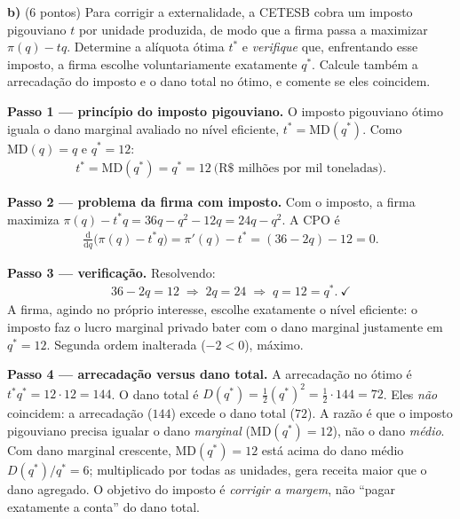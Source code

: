 \textbf{b)} (6 pontos) Para corrigir a externalidade, a CETESB cobra um imposto pigouviano $t$ por unidade produzida, de modo que a firma passa a maximizar $\pi(q)-tq$. Determine a alíquota ótima $t^{*}$ e \emph{verifique} que, enfrentando esse imposto, a firma escolhe voluntariamente exatamente $q^{*}$. Calcule também a arrecadação do imposto e o dano total no ótimo, e comente se eles coincidem.
\resolucaobox{5.5cm}
\begin{solucao}
\textbf{Passo 1 — princípio do imposto pigouviano.} O imposto pigouviano ótimo iguala o dano marginal avaliado no nível eficiente, $t^{*}=\text{MD}(q^{*})$. Como $\text{MD}(q)=q$ e $q^{*}=12$:
\begin{align*}
t^{*}=\text{MD}(q^{*})=q^{*}=12\ \text{(R\$~milhões por mil toneladas)}.
\end{align*}

\textbf{Passo 2 — problema da firma com imposto.} Com o imposto, a firma maximiza $\pi(q)-t^{*}q=36q-q^{2}-12q=24q-q^{2}$. A CPO é
\begin{align*}
\frac{\mathrm{d}}{\mathrm{d}q}\big(\pi(q)-t^{*}q\big)=\pi'(q)-t^{*}=(36-2q)-12=0.
\end{align*}

\textbf{Passo 3 — verificação.} Resolvendo:
\begin{align*}
36-2q=12\;\Longrightarrow\; 2q=24\;\Longrightarrow\; q=12=q^{*}.\ \checkmark
\end{align*}
A firma, agindo no próprio interesse, escolhe exatamente o nível eficiente: o imposto faz o lucro marginal privado bater com o dano marginal justamente em $q^{*}=12$. Segunda ordem inalterada ($-2<0$), máximo.

\textbf{Passo 4 — arrecadação versus dano total.} A arrecadação no ótimo é $t^{*}q^{*}=12\cdot 12=144$. O dano total é $D(q^{*})=\tfrac{1}{2}(q^{*})^{2}=\tfrac{1}{2}\cdot 144=72$. Eles \emph{não} coincidem: a arrecadação ($144$) excede o dano total ($72$). A razão é que o imposto pigouviano precisa igualar o dano \emph{marginal} ($\text{MD}(q^{*})=12$), não o dano \emph{médio}. Com dano marginal crescente, $\text{MD}(q^{*})=12$ está acima do dano médio $D(q^{*})/q^{*}=6$; multiplicado por todas as unidades, gera receita maior que o dano agregado. O objetivo do imposto é \emph{corrigir a margem}, não ``pagar exatamente a conta'' do dano total.


\end{solucao}
